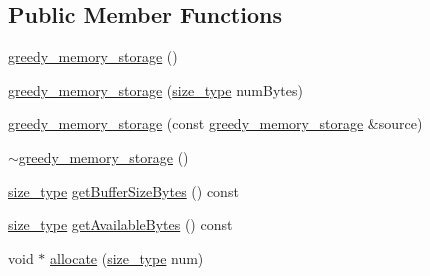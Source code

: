 \subsection*{Public Member Functions}
\begin{DoxyCompactItemize}
\item 
\hyperlink{classuva_1_1utils_1_1containers_1_1greedy__memory__storage_a3d5e7e27b732146852c15ae14582bc1c}{greedy\+\_\+memory\+\_\+storage} ()
\item 
\hyperlink{classuva_1_1utils_1_1containers_1_1greedy__memory__storage_a359fdce02b4bc4bb8466db2880a1dfd8}{greedy\+\_\+memory\+\_\+storage} (\hyperlink{classuva_1_1utils_1_1containers_1_1greedy__memory__storage_a50b3509335bfab9e81ac0ec31b3a21ca}{size\+\_\+type} num\+Bytes)
\item 
\hyperlink{classuva_1_1utils_1_1containers_1_1greedy__memory__storage_a3d122546d87730a2b672427b0efeaa50}{greedy\+\_\+memory\+\_\+storage} (const \hyperlink{classuva_1_1utils_1_1containers_1_1greedy__memory__storage}{greedy\+\_\+memory\+\_\+storage} \&source)
\item 
\hyperlink{classuva_1_1utils_1_1containers_1_1greedy__memory__storage_aa961c9559b3fbaab26334629a85605ad}{$\sim$greedy\+\_\+memory\+\_\+storage} ()
\item 
\hyperlink{classuva_1_1utils_1_1containers_1_1greedy__memory__storage_a50b3509335bfab9e81ac0ec31b3a21ca}{size\+\_\+type} \hyperlink{classuva_1_1utils_1_1containers_1_1greedy__memory__storage_a7dfdaf506cf29ce143972664df4b973d}{get\+Buffer\+Size\+Bytes} () const 
\item 
\hyperlink{classuva_1_1utils_1_1containers_1_1greedy__memory__storage_a50b3509335bfab9e81ac0ec31b3a21ca}{size\+\_\+type} \hyperlink{classuva_1_1utils_1_1containers_1_1greedy__memory__storage_acfc4cb3e7b2a05bcd0735abd9b1eec0a}{get\+Available\+Bytes} () const 
\item 
void $\ast$ \hyperlink{classuva_1_1utils_1_1containers_1_1greedy__memory__storage_a9e1edb4d60cb58cb2cb0dd0f80f97dfa}{allocate} (\hyperlink{classuva_1_1utils_1_1containers_1_1greedy__memory__storage_a50b3509335bfab9e81ac0ec31b3a21ca}{size\+\_\+type} num)
\end{DoxyCompactItemize}
